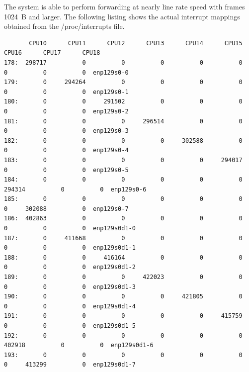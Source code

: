 \noindent
The system is able to perform forwarding at nearly line rate speed with frames 1024~B and larger.
The following listing shows the actual interrupt mappings obtained from the /proc/interrupts file.
\newpage
\begin{landscape}
\vspace*{\fill}
\begin{lstlisting}
       CPU10      CPU11      CPU12      CPU13      CPU14      CPU15      CPU16      CPU17      CPU18
178:  298717          0          0          0          0          0          0          0          0  enp129s0-0
179:       0     294264          0          0          0          0          0          0          0  enp129s0-1
180:       0          0     291502          0          0          0          0          0          0  enp129s0-2
181:       0          0          0     296514          0          0          0          0          0  enp129s0-3
182:       0          0          0          0     302588          0          0          0          0  enp129s0-4
183:       0          0          0          0          0     294017          0          0          0  enp129s0-5
184:       0          0          0          0          0          0     294314          0          0  enp129s0-6
185:       0          0          0          0          0          0          0     302088          0  enp129s0-7
186:  402863          0          0          0          0          0          0          0          0  enp129s0d1-0
187:       0     411668          0          0          0          0          0          0          0  enp129s0d1-1
188:       0          0     416164          0          0          0          0          0          0  enp129s0d1-2
189:       0          0          0     422023          0          0          0          0          0  enp129s0d1-3
190:       0          0          0          0     421805          0          0          0          0  enp129s0d1-4
191:       0          0          0          0          0     415759          0          0          0  enp129s0d1-5
192:       0          0          0          0          0          0     402918          0          0  enp129s0d1-6
193:       0          0          0          0          0          0          0     413299          0  enp129s0d1-7
\end{lstlisting}
\vspace*{\fill}
\end{landscape}

